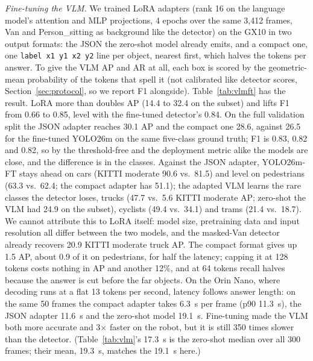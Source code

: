 \documentclass[conference]{IEEEtran}
\begin{document}
\textit{Fine-tuning the VLM.} We trained LoRA adapters \cite{hu2022lora} (rank 16 on the language model's attention
and MLP projections, 4 epochs over the same 3{,}412 frames, Van and Person\_sitting as background like the detector)
on the GX10 in two output formats:
the JSON the zero-shot model already emits, and a compact one, one \texttt{label x1 y1 x2 y2} line per object,
nearest first, which halves the tokens per answer. To give the VLM AP and AR at all, each box is scored by the
geometric-mean probability of the tokens that spell it (not calibrated like detector scores, Section~\ref{sec:protocol}, so we
report F1 alongside). Table~\ref{tab:vlmft} has the result. LoRA more than doubles AP (14.4 to 32.4 on the subset)
and lifts F1 from 0.66 to 0.85, level with the fine-tuned detector's 0.84. On the full validation split the JSON
adapter reaches 30.1 AP and the compact one 28.6, against 26.5 for the fine-tuned YOLO26m on the same five-class
ground truth; F1 is 0.83, 0.82 and 0.82, so by the threshold-free and the deployment metric alike the models are
close, and the difference is in the classes. Against the JSON adapter, YOLO26m-FT stays ahead on cars (KITTI
moderate 90.6 vs.\ 81.5) and level on pedestrians (63.3 vs.\ 62.4; the compact adapter has 51.1); the adapted VLM learns the rare classes the detector loses, trucks (47.7 vs.\
5.6 KITTI moderate AP; zero-shot the VLM had 24.9 on the subset), cyclists (49.4 vs.\ 34.1) and trams (21.4 vs.\
18.7). We cannot attribute this
to LoRA itself: model size, pretraining data and input resolution all differ between the two models, and the masked-Van
detector already recovers 20.9 KITTI moderate truck AP. The compact format gives up 1.5 AP, about 0.9 of it on pedestrians, for
half the latency; capping it
at 128 tokens costs nothing in AP and another 12\%, and at 64 tokens recall halves because the answer is cut before
the far objects. On the Orin Nano, where decoding runs at a flat 13 tokens per second, latency follows
answer length: on the same 50 frames the compact adapter takes 6.3~s per frame (p90 11.3~s), the JSON adapter 11.6~s
and the zero-shot model 19.1~s. Fine-tuning made the VLM both more accurate and 3$\times$ faster on the robot, but it
is still 350 times slower than the detector. (Table~\ref{tab:vlm}'s 17.3~s is the zero-shot median over all 300
frames; their mean, 19.3~s, matches the 19.1~s here.)
\end{document}
